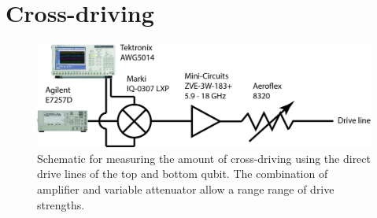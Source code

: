     \section{Cross-driving}
      \label{sec:cross-driving}

      \begin{figure}[tb]
        \centering
        \includegraphics[width=.8\textwidth]{../Figures/Exploring frequency re-use/cross-driving_setup.jpg}
        \caption{Schematic for measuring the amount of cross-driving using the direct drive lines of the top and bottom qubit. The combination of amplifier and variable attenuator allow a range range of drive strengths.}
        \label{fig:cross-driving schematic}
      \end{figure}

